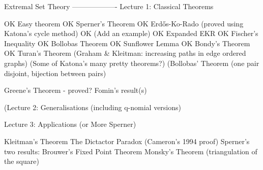 Extremal Set Theory
-------------------
Lecture 1: Classical Theorems

OK Easy theorem
OK Sperner's Theorem
OK Erd\H{o}s-Ko-Rado (proved using Katona's cycle method)
OK (Add an example)
OK Expanded EKR
OK Fischer's Inequality
OK Bollobas Theorem
OK Sunflower Lemma
OK Bondy's Theorem
OK Turan's Theorem
   (Graham & Kleitman: increasing paths in edge ordered graphs)
   (Some of Katona's many pretty theorems?)
   (Bollobas' Theorem (one pair disjoint, bijection between pairs)


Greene's Theorem - proved? Fomin's result(s)

(Lecture 2: Generalisations (including q-nomial versions)

Lecture 3: Applications (or More Sperner)


Kleitman's Theorem
The Dictactor Paradox (Cameron's 1994 proof)
Sperner's two results:
  Brouwer's Fixed Point Theorem
  Monsky's Theorem (triangulation of the square)
